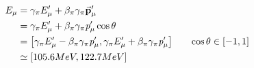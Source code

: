 \begin{align*}
        E_{\mu} &= \gamma_{\pi}E^{\prime}_{\mu} + \beta_{\pi}\gamma_{\pi}\va{p}^{\prime}_{\mu} \\
                &= \gamma_{\pi}E^{\prime}_{\mu} + \beta_{\pi}\gamma_{\pi}\textit{p}^{\prime}_{\mu}\cos{\theta}\\
                &= \qty[\gamma_{\pi}E^{\prime}_{\mu} - \beta_{\pi}\gamma_{\pi}\textit{p}^{\prime}_{\mu} , \gamma_{\pi}E^{\prime}_{\mu} + \beta_{\pi}\gamma_{\pi}\textit{p}^{\prime}_{\mu}]  \tag*{$\cos{\theta} \in [-1,1]$} \\
                &\simeq \qty[105.6 MeV , 122.7 MeV]
\end{align*}

